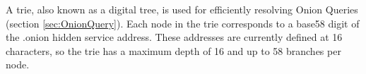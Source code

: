 A trie, also known as a digital tree, is used for efficiently resolving Onion Queries (section \ref{sec:OnionQuery}). Each node in the trie corresponds to a base58 digit of the .onion hidden service address. These addresses are currently defined at 16 characters, so the trie has a maximum depth of 16 and up to 58 branches per node.






























